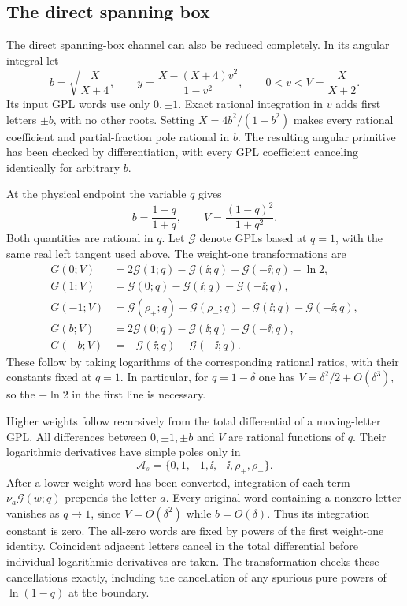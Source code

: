 \subsection{The direct spanning box}
The direct spanning-box channel can also be reduced completely.  In its
angular integral let
\begin{equation}
 b=\sqrt{\frac{X}{X+4}},\qquad
 y=\frac{X-(X+4)v^2}{1-v^2},\qquad
 0<v<V=\frac{X}{X+2}.
\end{equation}
Its input GPL words use only $0,\pm1$.  Exact rational integration in
$v$ adds first letters $\pm b$, with no other roots.  Setting
$X=4b^2/(1-b^2)$ makes every rational coefficient and partial-fraction
pole rational in $b$.  The resulting angular primitive has been
checked by differentiation, with every GPL coefficient canceling
identically for arbitrary $b$.

At the physical endpoint the variable $q$ gives
\begin{equation}
 b=\frac{1-q}{1+q},\qquad V=\frac{(1-q)^2}{1+q^2}.
\end{equation}
Both quantities are rational in $q$.  Let $\mathcal G$ denote GPLs
based at $q=1$, with the same real left tangent used above.  The
weight-one transformations are
\begin{align}
 G(0;V)&=2\mathcal G(1;q)-\mathcal G(\ii;q)
                   -\mathcal G(-\ii;q)-\ln2,\\
 G(1;V)&=\mathcal G(0;q)-\mathcal G(\ii;q)-\mathcal G(-\ii;q),\\
 G(-1;V)&=\mathcal G(\rho_+;q)+\mathcal G(\rho_-;q)
                  -\mathcal G(\ii;q)-\mathcal G(-\ii;q),\\
 G(b;V)&=2\mathcal G(0;q)-\mathcal G(\ii;q)-\mathcal G(-\ii;q),\\
 G(-b;V)&=-\mathcal G(\ii;q)-\mathcal G(-\ii;q).
\end{align}
These follow by taking logarithms of the corresponding rational ratios,
with their constants fixed at $q=1$.  In particular, for
$q=1-\delta$ one has $V=\delta^2/2+O(\delta^3)$, so the $-\ln2$
in the first line is necessary.

Higher weights follow recursively from the total differential of a
moving-letter GPL.  All differences between $0,\pm1,\pm b$ and $V$
are rational functions of $q$.  Their logarithmic derivatives have
simple poles only in
\begin{equation}
 \mathcal A_s=\{0,1,-1,\ii,-\ii,\rho_+,\rho_-\}.
\end{equation}
After a lower-weight word has been converted, integration of each term
$\nu_a\mathcal G(w;q)$ prepends the letter $a$.  Every original word
containing a nonzero letter vanishes as $q\to1$, since $V=O(\delta^2)$
while $b=O(\delta)$.  Thus its integration constant is zero.  The
all-zero words are fixed by powers of the first weight-one identity.
Coincident adjacent letters cancel in the total differential before
individual logarithmic derivatives are taken.  The transformation
checks these cancellations exactly, including the cancellation of
any spurious pure powers of $\ln(1-q)$ at the boundary.

